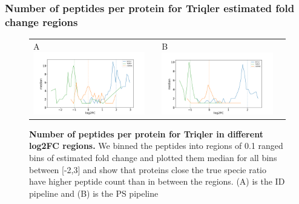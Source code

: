 \documentclass[11pt]{article}
\begin{document}
\subsubsection*{Number of peptides per protein for Triqler estimated fold change regions}
\begin{figure}[hbt]
    \centering
    \centering
    \begin{tabular}{lclc} 
        A \includegraphics[width=0.5\linewidth]{../../result/report_plots_pipeline/fc_peptide_count_ID_triqler.png} & &
        B \includegraphics[width=0.5\linewidth]{../../result/report_plots_pipeline/fc_peptide_count_PS_triqler.png} & \\
    \end{tabular}
  \caption{{\bf Number of peptides per protein for Triqler in different log2FC regions.} We binned the peptides into regions of 0.1 ranged bins of estimated fold change and plotted them median for all bins between [-2,3] and show that proteins close the true specie ratio have higher peptide count than in between the regions. (A) is the ID pipeline and (B) is the PS pipeline \label{fig:number_of_peptides_supplement}}
\end{figure}
\end{document}
